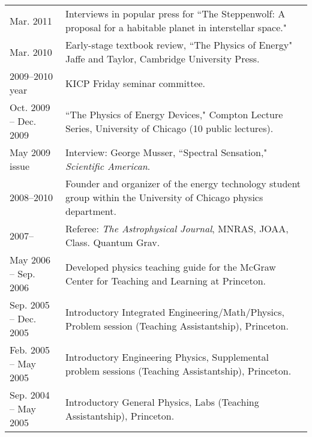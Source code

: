 {\begin{tabular}{l p{12cm}}
Mar. 2011 & Interviews in popular press for ``The Steppenwolf: A proposal for a habitable planet in interstellar space." \\
Mar. 2010  & Early-stage textbook review, ``The Physics of Energy" Jaffe and Taylor, Cambridge University Press. \\
2009--2010 year & KICP Friday seminar committee. \\
Oct. 2009 -- Dec. 2009 & ``The Physics of Energy Devices," Compton Lecture Series, University of Chicago (10 public lectures). \\
May 2009 issue & Interview: George Musser, ``Spectral Sensation," {\it Scientific American}. \\
2008--2010     & Founder and organizer of the energy technology student group within the University of Chicago physics department. \\
2007--         & Referee: {\it The Astrophysical Journal}, MNRAS, JOAA, Class. Quantum Grav. \\
May 2006 -- Sep. 2006 & Developed physics teaching guide for the McGraw Center for Teaching and Learning at Princeton. \\
Sep. 2005 -- Dec. 2005 & Introductory Integrated Engineering/Math/Physics, Problem session (Teaching Assistantship), Princeton. \\ %
Feb. 2005 -- May 2005 & Introductory Engineering Physics, Supplemental problem sessions (Teaching Assistantship), Princeton. \\ %
Sep. 2004 -- May 2005 & Introductory General Physics, Labs (Teaching Assistantship), Princeton. \\ %
\end{tabular} \\~\\~\\
}


